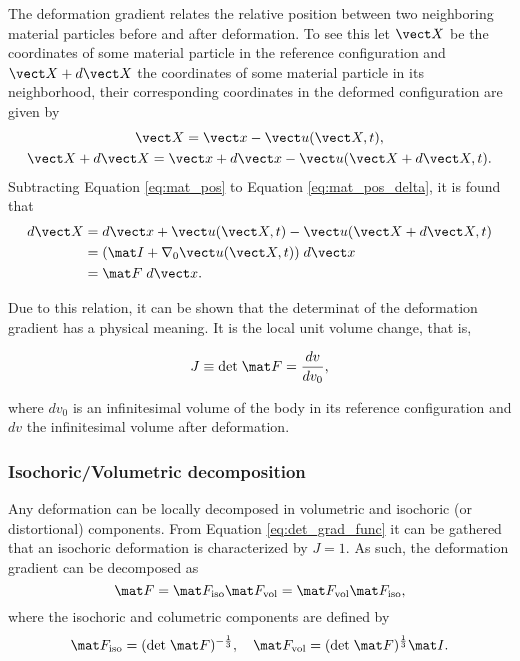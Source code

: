 The deformation gradient relates the relative position between two neighboring material particles before and after deformation.
To see this let $\vect X$ be the coordinates of some material particle in the reference configuration and $\vect X + d\vect X$ the coordinates of some material particle in its neighborhood, their corresponding coordinates in the deformed configuration are given by
\begin{gather}
    \vect X = \vect x - \vect u(\vect X, t), \label{eq:mat_pos}\\
    \vect X + d\vect X = \vect x + d\vect x -\vect u(\vect X +d\vect X, t). \label{eq:mat_pos_delta}
\end{gather}
Subtracting Equation \eqref{eq:mat_pos} to Equation \eqref{eq:mat_pos_delta}, it is found that
\begin{align}
    d\vect X &= d\vect x +\vect u(\vect X, t)-\vect u(\vect X +d\vect X, t)\\
             &=(\mat I +\nabla_0 \vect u(\vect X, t))\; d\vect x\\
             &=\mat F\;d\vect x.
\end{align}

Due to this relation, it can be shown that the determinat of the deformation gradient has a physical meaning.
It is the local unit volume change, that is,
\begin{highlight}
\begin{equation}
   J\equiv \text{det}\;\mat F = \frac{dv}{dv_0}, \label{eq:det_grad_func}
\end{equation}
\end{highlight}
where $dv_0$ is an infinitesimal volume of the body in its reference configuration and $dv$ the infinitesimal volume after deformation.

\subsubsection{Isochoric/Volumetric decomposition}

Any deformation can be locally decomposed in volumetric and isochoric (or distortional) components.
From Equation \eqref{eq:det_grad_func} it can be gathered that an isochoric deformation is characterized by $J=1$.
As such, the deformation gradient can be decomposed as
\begin{equation}
    \mat F = \mat F_\text{iso} \mat F_\text{vol} = \mat F_\text{vol} \mat F_\text{iso},
\end{equation}
where the isochoric and columetric components are defined by
\begin{equation}
    \mat F_\text{iso} = (\text{det}\;\mat F)^{-\frac{1}{3}},\quad \mat F_\text{vol} = (\text{det}\;\mat F)^{\frac{1}{3}}\mat I.
\end{equation}

